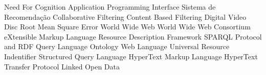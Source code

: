 \begin{acronym}[ACRONYM] 

 { Need For Cognition }
 { Application Programming Interface }
 { Sistema de Recomendação }
 { Collaborative Filtering }
 { Content Based Filtering}
 {Digital Video Disc}
 {Root Mean Square Error}
 {World Wide Web}
 {World Wide Web Consortium}
 {eXtensible Markup Language}
 {Resource Description Framework}
 {SPARQL Protocol and RDF Query Language}
 {Ontology Web Language}
 {Universal Resource Indentifier}
 {Structured Query Language}
 {HyperText Markup Language}
 {HyperText Transfer Protocol}
 {Linked Open Data}
    
\end{acronym}